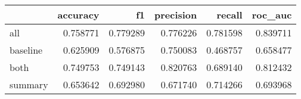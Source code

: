 \begin{tabular}{lrrrrr}
\toprule
{} &  accuracy &        f1 &  precision &    recall &   roc\_auc \\
\midrule
all      &  0.758771 &  0.779289 &   0.776226 &  0.781598 &  0.839711 \\
baseline &  0.625909 &  0.576875 &   0.750083 &  0.468757 &  0.658477 \\
both     &  0.749753 &  0.749143 &   0.820763 &  0.689140 &  0.812432 \\
summary  &  0.653642 &  0.692980 &   0.671740 &  0.714266 &  0.693968 \\
\bottomrule
\end{tabular}

